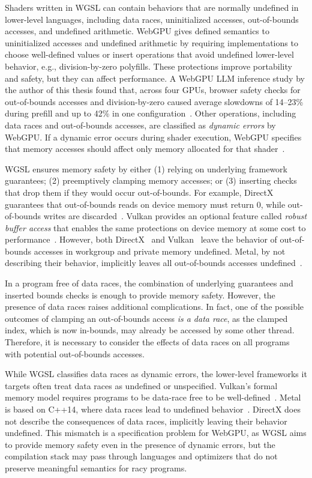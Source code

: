 Shaders written in WGSL can contain behaviors that are normally undefined in lower-level languages, including data races, uninitialized accesses, out-of-bounds accesses, and undefined arithmetic. WebGPU gives defined semantics to uninitialized accesses and undefined arithmetic by requiring implementations to choose well-defined values or insert operations that avoid undefined lower-level behavior, e.g., division-by-zero polyfills. These protections improve portability and safety, but they can affect performance. A WebGPU LLM inference study by the author of this thesis found that, across four GPUs, browser safety checks for out-of-bounds accesses and division-by-zero caused average slowdowns of 14--23\% during prefill and up to 42\% in one configuration~\cite{levine2026llamaweb}. Other operations, including data races and out-of-bounds accesses, are classified as \textit{dynamic errors} by WebGPU. If a dynamic error occurs during shader execution, WebGPU specifies that memory accesses should affect only memory allocated for that shader~\cite[]{wgslspec}.

WGSL ensures memory safety by either (1) relying on underlying framework guarantees; (2) preemptively clamping memory accesses; or (3) inserting checks that drop them if they would occur out-of-bounds. For example, DirectX guarantees that out-of-bounds reads on device memory must return 0, while out-of-bounds writes are discarded~\cite{microsoft2024d3d11csaccess}. Vulkan provides an optional feature called \textit{robust buffer access} that enables the same protections on device memory at some cost to performance~\cite{vulkan2024robustness}. However, both DirectX~\cite{ldraw2024} and Vulkan~\cite[.8]{spir-v} leave the behavior of out-of-bounds accesses in workgroup and private memory undefined. Metal, by not describing their behavior, implicitly leaves all out-of-bounds accesses undefined~\cite{metal-sl}.

In a program free of data races, the combination of underlying guarantees and inserted bounds checks is enough to provide memory safety. However, the presence of data races raises additional complications. In fact, one of the possible outcomes of clamping an out-of-bounds access \textit{is a data race}, as the clamped index, which is now in-bounds, may already be accessed by some other thread. Therefore, it is necessary to consider the effects of data races on all programs with potential out-of-bounds accesses.

While WGSL classifies data races as dynamic errors, the lower-level frameworks it targets often treat data races as undefined or unspecified. Vulkan's formal memory model requires programs to be data-race free to be well-defined~\cite[App. B]{vulkan}. Metal is based on C++14, where data races lead to undefined behavior~\cite{cppreference2024multithread}. DirectX does not describe the consequences of data races, implicitly leaving their behavior undefined. This mismatch is a specification problem for WebGPU, as WGSL aims to provide memory safety even in the presence of dynamic errors, but the compilation stack may pass through languages and optimizers that do not preserve meaningful semantics for racy programs.


